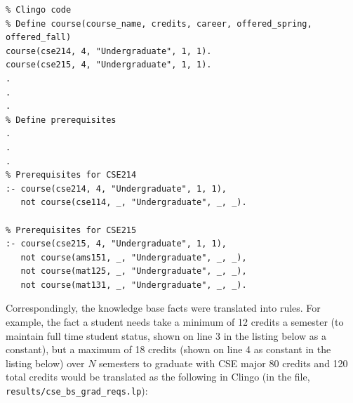 \documentclass[12pt]{article}
\begin{document}
    \begin{lstlisting}
% Clingo code
% Define course(course_name, credits, career, offered_spring, offered_fall)
course(cse214, 4, "Undergraduate", 1, 1).
course(cse215, 4, "Undergraduate", 1, 1).
.
.
.
% Define prerequisites
.
.
.
% Prerequisites for CSE214
:- course(cse214, 4, "Undergraduate", 1, 1), 
   not course(cse114, _, "Undergraduate", _, _). 

% Prerequisites for CSE215
:- course(cse215, 4, "Undergraduate", 1, 1), 
   not course(ams151, _, "Undergraduate", _, _), 
   not course(mat125, _, "Undergraduate", _, _), 
   not course(mat131, _, "Undergraduate", _, _). 
    \end{lstlisting}

    Correspondingly, the knowledge base facts were translated into rules. For example, the fact a student needs take a minimum of 12 credits a semester (to maintain full time student status, shown on line 3 in the listing below as a constant), but a maximum of 18 credits (shown on line 4 as constant in the listing below) over $N$ semesters to graduate with CSE major 80 credits and 120 total credits would be translated as the following in Clingo (in the file, {\tt{results/cse\_bs\_grad\_reqs.lp}}): \\
\end{document}
